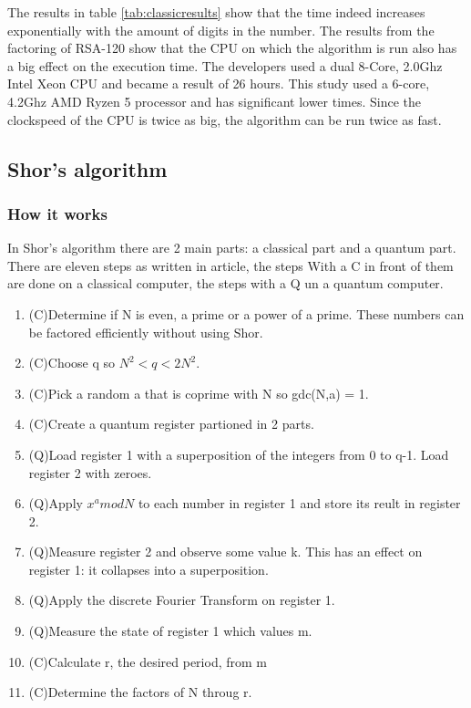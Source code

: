 The results in table \ref{tab:classicresults} show that the time indeed increases exponentially with the amount of digits in the number. The results from the factoring of RSA-120 show that the CPU on which the algorithm is run also has a big effect on the execution time.
The developers used a dual 8-Core, 2.0Ghz Intel Xeon CPU and became a result of 26 hours. This study used a 6-core, 4.2Ghz AMD Ryzen 5 processor and has significant lower times. Since the clockspeed of the CPU is twice as big, the algorithm can be run twice as fast.


\subsection{Shor's algorithm}
\subsubsection{How it works}
In Shor's algorithm there are 2 main parts: a classical part and a quantum part.
There are eleven steps as written in \textcite{shor_step} article, the steps With a C in front of them are done on a classical computer, the steps with a Q un a quantum computer.
\begin{enumerate}
    \item (C)Determine if N is even, a prime or a power of a prime. These numbers can be factored efficiently without using Shor. 
    \item (C)Choose q so $N^2<q<2N^2$.
    \item (C)Pick a random a that is coprime with N so gdc(N,a) = 1.
    \item (C)Create a quantum register partioned in 2 parts.
    \item (Q)Load register 1 with a superposition of the integers from 0 to q-1. Load register 2 with zeroes.
    \item (Q)Apply $x^a mod N$ to each number in register 1 and store its reult in register 2.
    \item (Q)Measure register 2 and observe some value k. This has an effect on register 1: it collapses into a superposition.
    \item (Q)Apply the discrete Fourier Transform on register 1.
    \item (Q)Measure the state of register 1 which values m.
    \item (C)Calculate r, the desired period, from m
    \item (C)Determine the factors of N throug r.

\end{enumerate}
